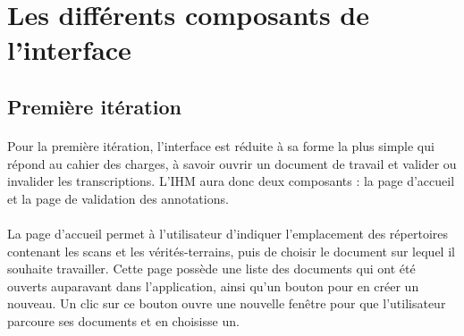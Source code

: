 \section{Les différents composants de l'interface}

\subsection{Première itération}

\paragraph{}
Pour la première itération, l’interface est réduite à sa forme la plus simple qui répond au cahier des charges, à savoir ouvrir un document de travail et valider ou invalider les transcriptions. L’IHM aura donc deux composants : la page d’accueil et la page de validation des annotations.

\paragraph{}
La page d’accueil permet à l’utilisateur d’indiquer l’emplacement des répertoires contenant les scans et les vérités-terrains, puis de choisir le document sur lequel il souhaite travailler. Cette page possède une liste des documents qui ont été ouverts auparavant dans l’application, ainsi qu’un bouton pour en créer un nouveau. Un clic sur ce bouton ouvre une nouvelle fenêtre pour que l’utilisateur parcoure ses documents et en choisisse un.


